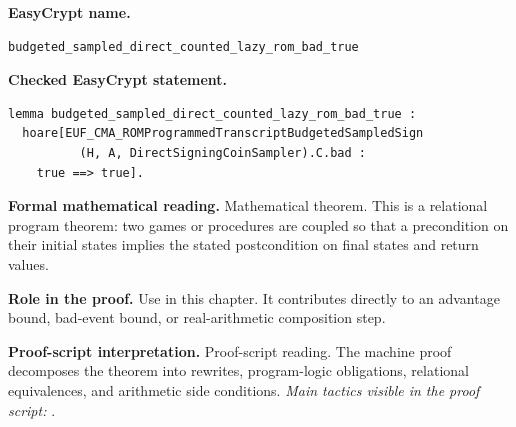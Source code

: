 \begin{formaltheorem}
\noindent\textbf{EasyCrypt name.}
\begin{lstlisting}[language=EasyCrypt,basicstyle=\ttfamily\scriptsize]
budgeted_sampled_direct_counted_lazy_rom_bad_true
\end{lstlisting}
\noindent\textbf{Checked EasyCrypt statement.}
\begin{lstlisting}[language=EasyCrypt,basicstyle=\ttfamily\scriptsize]
lemma budgeted_sampled_direct_counted_lazy_rom_bad_true :
  hoare[EUF_CMA_ROMProgrammedTranscriptBudgetedSampledSign
          (H, A, DirectSigningCoinSampler).C.bad :
    true ==> true].
\end{lstlisting}
\noindent\textbf{Formal mathematical reading.}
Mathematical theorem. This is a relational program theorem: two games or procedures are coupled so that a precondition on their initial states implies the stated postcondition on final states and return values.

\noindent\textbf{Role in the proof.}
Use in this chapter. It contributes directly to an advantage bound, bad-event bound, or real-arithmetic composition step.

\noindent\textbf{Proof-script interpretation.}
Proof-script reading. The machine proof decomposes the theorem into rewrites, program-logic obligations, relational equivalences, and arithmetic side conditions.
\emph{Main tactics visible in the proof script:} .

\end{formaltheorem}

